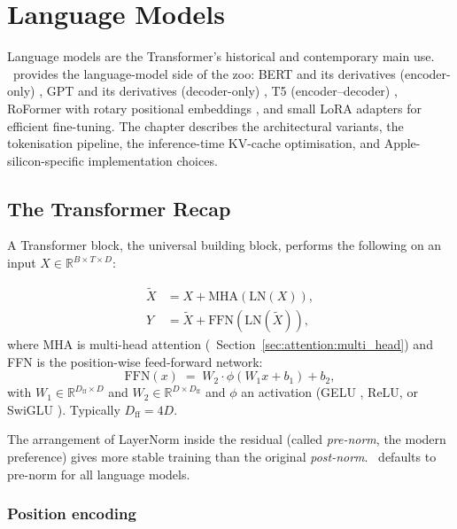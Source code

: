 \chapter{Language Models}
\label{ch:language_models}

Language models are the Transformer's \cite{vaswani_attention_2017}
historical and contemporary main use. \Lucid\ provides the
language-model side of the zoo: BERT and its derivatives
(encoder-only) \cite{devlin_bert_2019, liu_roberta_2019,
lan_albert_2020}, GPT and its derivatives (decoder-only)
\cite{radford_gpt2_2019, brown_gpt3_2020, touvron_llama_2023},
T5 (encoder--decoder) \cite{raffel_t5_2020}, RoFormer with
rotary positional embeddings \cite{su_roformer_2021}, and
small LoRA \cite{hu_lora_2021} adapters for efficient
fine-tuning. The chapter describes the architectural variants,
the tokenisation pipeline, the inference-time KV-cache
optimisation, and Apple-silicon-specific implementation choices.

\section{The Transformer Recap}
\label{sec:language_models:transformer_recap}

A Transformer block, the universal building block, performs the
following on an input $X \in \mathbb{R}^{B \times T \times D}$:

\begin{align}
  \tilde{X} &= X + \mathrm{MHA}(\mathrm{LN}(X)), \\
  Y &= \tilde{X} + \mathrm{FFN}(\mathrm{LN}(\tilde{X})),
\end{align}
where MHA is multi-head attention
(~Section~\ref{sec:attention:multi_head}) and FFN
is the position-wise feed-forward network:
\[
  \mathrm{FFN}(x) \;=\; W_2 \cdot \phi(W_1 x + b_1) + b_2,
\]
with $W_1 \in \mathbb{R}^{D_{\text{ff}} \times D}$ and
$W_2 \in \mathbb{R}^{D \times D_{\text{ff}}}$ and $\phi$ an
activation (GELU \cite{hendrycks_gelu_2016}, ReLU, or
SwiGLU \cite{shazeer_glu_2020}). Typically
$D_{\text{ff}} = 4D$.

The arrangement of LayerNorm inside the residual (called
\emph{pre-norm}, the modern preference) gives more stable
training than the original \emph{post-norm}. \Lucid\ defaults to
pre-norm for all language models.

\subsection{Position encoding}
\label{ssec:language_models:pos_encoding}

